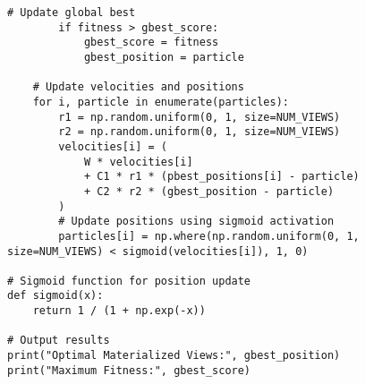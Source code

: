 \begin{lstlisting}[style=python, caption={Python Code Example}]
        # Update global best
        if fitness > gbest_score:
            gbest_score = fitness
            gbest_position = particle

    # Update velocities and positions
    for i, particle in enumerate(particles):
        r1 = np.random.uniform(0, 1, size=NUM_VIEWS)
        r2 = np.random.uniform(0, 1, size=NUM_VIEWS)
        velocities[i] = (
            W * velocities[i]
            + C1 * r1 * (pbest_positions[i] - particle)
            + C2 * r2 * (gbest_position - particle)
        )
        # Update positions using sigmoid activation
        particles[i] = np.where(np.random.uniform(0, 1, size=NUM_VIEWS) < sigmoid(velocities[i]), 1, 0)

# Sigmoid function for position update
def sigmoid(x):
    return 1 / (1 + np.exp(-x))

# Output results
print("Optimal Materialized Views:", gbest_position)
print("Maximum Fitness:", gbest_score)


\end{lstlisting}